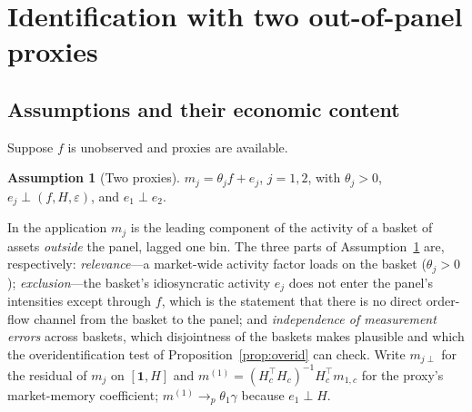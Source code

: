 \documentclass[12pt]{article}
\theoremstyle{plain}\newtheorem{theorem}{Theorem}[section]\newtheorem{proposition}[theorem]{Proposition}\newtheorem{lemma}[theorem]{Lemma}\newtheorem{corollary}[theorem]{Corollary}
\theoremstyle{definition}\newtheorem{definition}[theorem]{Definition}\newtheorem{assumption}[theorem]{Assumption}\newtheorem{remark}[theorem]{Remark}
\begin{document}
\section{Identification with two out-of-panel proxies}\label{sec:iv}
\subsection{Assumptions and their economic content}
Suppose $f$ is unobserved and proxies are available.
\begin{assumption}[Two proxies]\label{ass:proxies}
$m_j=\theta_jf+e_j$, $j=1,2$, with $\theta_j>0$, $e_j\perp(f,H,\varepsilon)$, and $e_1\perp e_2$.
\end{assumption}
In the application $m_j$ is the leading component of the activity of a basket of assets \emph{outside} the panel, lagged one bin. The three parts of Assumption~\ref{ass:proxies} are, respectively: \emph{relevance}---a market-wide activity factor loads on the basket ($\theta_j>0$); \emph{exclusion}---the basket's idiosyncratic activity $e_j$ does not enter the panel's intensities except through $f$, which is the statement that there is no direct order-flow channel from the basket to the panel; and \emph{independence of measurement errors} across baskets, which disjointness of the baskets makes plausible and which the overidentification test of Proposition~\ref{prop:overid} can check. Write $m_{j\perp}$ for the residual of $m_j$ on $[\mathbf 1,H]$ and $m^{(1)}=(H_c^\top H_c)^{-1}H_c^\top m_{1,c}$ for the proxy's market-memory coefficient; $m^{(1)}\to_p\theta_1\gamma$ because $e_1\perp H$.
\end{document}
